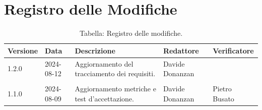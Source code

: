 \documentclass[8pt]{article}
\begin{document}
\section*{Registro delle Modifiche}
\begin{table}[ht!]	
	\centering
	\begin{tabular}{p{1.2cm} p{2cm} p{6cm} p{3cm} p{2cm}}
		\toprule
		\textbf{Versione}& \textbf{Data} & \textbf{Descrizione} & \textbf{Redattore} & \textbf{Verificatore} \\
		\midrule
        1.2.0 & 2024-08-12 & Aggiornamento del tracciamento dei requisiti. & Davide Donanzan &  \\\\
        1.1.0 & 2024-08-09 & Aggiornamento metriche e test d'accettazione. & Davide Donanzan & Pietro Busato \\
		\bottomrule
	\end{tabular}
	\caption*{Tabella: Registro delle modifiche.}
	\label{table:Registro delle modifiche}
\end{table}
\newpage
\end{document}
